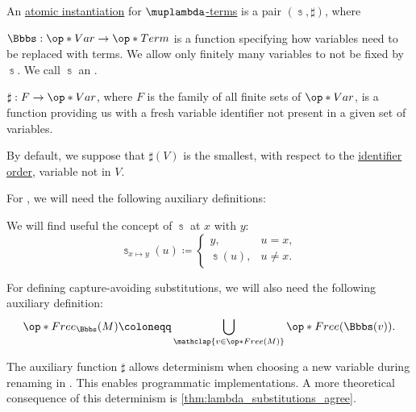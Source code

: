 \begin{definition}\label{def:atomic_lambda_term_substitution}\mimprovised
  An \hyperref[con:syntactic_substitution]{atomic instantiation} for \hyperref[def:lambda_term]{\( \muplambda \)-terms} is a pair \( (\Bbbs, \sharp) \), where
  \begin{thmenum}[series=def:atomic_lambda_term_substitution]
     \( \Bbbs: \op*{Var} \to \op*{Term} \) is a function specifying how variables need to be replaced with terms. We allow only finitely many variables to not be fixed by \( \Bbbs \). We call \( \Bbbs \) an .

     \( \sharp: F \to \op*{Var} \), where \( F \) is the family of all finite sets of \( \op*{Var} \), is a function providing us with a fresh variable identifier not present in a given set of variables.

    By default, we suppose that \( \sharp(V) \) is the smallest, with respect to the \hyperref[def:variable_identifier]{identifier order}, variable not in \( V \).
  \end{thmenum}

  For , we will need the following auxiliary definitions:
  \begin{thmenum}[resume=def:atomic_lambda_term_substitution]
     We will find useful the concept of  \( \Bbbs \) at \( x \) with \( y \):
    \begin{equation}\label{eq:def:atomic_lambda_term_substitution/modified}
      \Bbbs_{x \mapsto y}(u) \coloneqq \begin{cases}
        y,        &u = x, \\
        \Bbbs(u), &u \neq x.
      \end{cases}
    \end{equation}

     For defining capture-avoiding substitutions, we will also need the following auxiliary definition:
    \begin{equation}\label{eq:def:atomic_lambda_term_substitution/free}
      \op*{Free}_\Bbbs(M) \coloneqq \bigcup_{\mathclap{v \in \op*{Free}(M)}} \op*{Free}(\Bbbs(v)).
    \end{equation}
  \end{thmenum}
\end{definition}
\begin{comments}
  \item The auxiliary function \( \sharp \) allows determinism when choosing a new variable during renaming in . This enables programmatic implementations. A more theoretical consequence of this determinism is \cref{thm:lambda_substitutions_agree}.
\end{comments}

